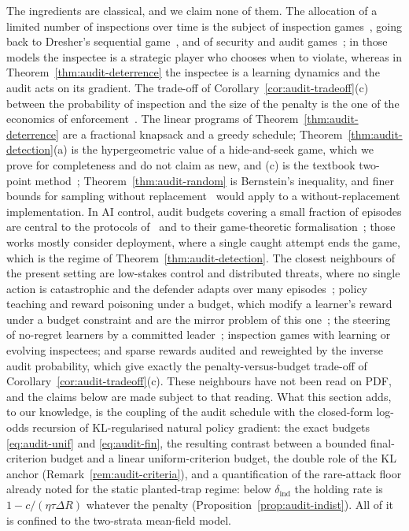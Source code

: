 \begin{remark}\label{rem:audit-related}
The ingredients are classical, and we claim none of them. The allocation of a
limited number of inspections over time is the subject of inspection
games~\cite{avenhaus2002inspection}, going back to Dresher's sequential
game~\cite{dresher1962sampling}, and of security and audit
games~\cite{tambe2011security,blocki2013audit}; in those models the inspectee is
a strategic player who chooses when to violate, whereas in
Theorem~\ref{thm:audit-deterrence} the inspectee is a learning dynamics and the
audit acts on its gradient. The trade-off of
Corollary~\ref{cor:audit-tradeoff}(c) between the probability of inspection and
the size of the penalty is the one of the economics of
enforcement~\cite{becker1968crime}. The linear programs of
Theorem~\ref{thm:audit-deterrence} are a fractional knapsack and a greedy
schedule; Theorem~\ref{thm:audit-detection}(a) is the hypergeometric value of a
hide-and-seek game, which we prove for completeness and do not claim as new,
and (c) is the textbook two-point method~\cite{lecam1973convergence,yu1997assouad};
Theorem~\ref{thm:audit-random} is Bernstein's inequality, and finer bounds for
sampling without replacement~\cite{hoeffding1963probability,serfling1974probability}
would apply to a without-replacement implementation. In AI control, audit
budgets covering a small fraction of episodes are central to the protocols
of~\cite{greenblatt2023control} and to their game-theoretic
formalisation~\cite{griffin2024games}; those works mostly consider deployment, where a
single caught attempt ends the game, which is the regime of
Theorem~\ref{thm:audit-detection}. The closest neighbours of the present setting are low-stakes control and distributed threats, where no single action is catastrophic and the defender adapts over many episodes~\cite{christiano2021lowstakes,wen2024adaptive}; policy teaching and reward poisoning under a budget, which modify a learner's reward under a budget constraint and are the mirror problem of this one~\cite{zhang2008policyteaching,rakhsha2020poisoning}; the steering of no-regret learners by a committed leader~\cite{deng2019strategizing}; inspection games with learning or evolving inspectees; and sparse rewards audited and reweighted by the inverse audit probability, which give exactly the penalty-versus-budget trade-off of Corollary~\ref{cor:audit-tradeoff}(c). These neighbours have not been read on PDF, and the claims below are made subject to that reading. What this section adds, to our knowledge, is
the coupling of the audit schedule with the closed-form log-odds recursion of
KL-regularised natural policy gradient: the exact budgets
\eqref{eq:audit-unif} and \eqref{eq:audit-fin}, the resulting contrast between
a bounded final-criterion budget and a linear uniform-criterion budget, the
double role of the KL anchor (Remark~\ref{rem:audit-criteria}), and a quantification of the rare-attack floor already noted for the static planted-trap regime: below $\delta_{\mathrm{ind}}$ the holding rate is $1-c/(\eta\tau\Delta R)$ whatever the penalty (Proposition~\ref{prop:audit-indist}). All of it is
confined to the two-strata mean-field model.
\end{remark}

